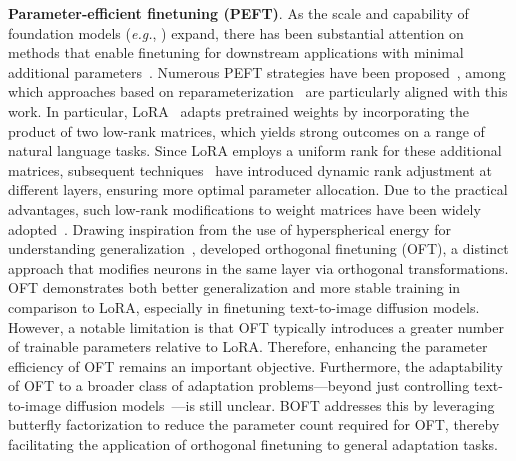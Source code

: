 \textbf{Parameter-efficient finetuning (PEFT)}. As the scale and capability of foundation models (\emph{e.g.}, \cite{brown2020language,radford2021learning,rombach2022high,kirillov2023segment}) expand, there has been substantial attention on methods that enable finetuning for downstream applications with minimal additional parameters~\cite{treviso2023efficient,ding2023parameter,lialin2023scaling}. Numerous PEFT strategies have been proposed~\cite{houlsby2019parameter,aghajanyan2020intrinsic,hulora2022,edalati2022krona,wang2022adamix,gheini2021cross,zaken2022bitfit,guo2020parameter,sung2021training,ansell2022composable,lester2021power,li2021prefix,vu2022spot,he2021towards,mao2021unipelt,karimi2021compacter,liu2022few,sung2022lst,chen2022parameter,jia2022visual,chen2022adaptformer,zhang2022neural,jie2023fact,lian2022scaling,luo2023towards}, among which approaches based on reparameterization~\cite{aghajanyan2020intrinsic,hulora2022,edalati2022krona} are particularly aligned with this work. In particular, LoRA~\cite{hulora2022} adapts pretrained weights by incorporating the product of two low-rank matrices, which yields strong outcomes on a range of natural language tasks. Since LoRA employs a uniform rank for these additional matrices, subsequent techniques~\cite{zhang2022adaptive,valipour2022dylora,zhang2023increlora} have introduced dynamic rank adjustment at different layers, ensuring more optimal parameter allocation. Due to the practical advantages, such low-rank modifications to weight matrices have been widely adopted~\cite{dettmers2023qlora,zi2023delta,chavan2023one}. Drawing inspiration from the use of hyperspherical energy for understanding generalization~\cite{liu2018learning,liu2021orthogonal}, \cite{qiu2023controlling} developed orthogonal finetuning (OFT), a distinct approach that modifies neurons in the same layer via orthogonal transformations. OFT demonstrates both better generalization and more stable training in comparison to LoRA, especially in finetuning text-to-image diffusion models. However, a notable limitation is that OFT typically introduces a greater number of trainable parameters relative to LoRA. Therefore, enhancing the parameter efficiency of OFT remains an important objective. Furthermore, the adaptability of OFT to a broader class of adaptation problems—beyond just controlling text-to-image diffusion models~\cite{qiu2023controlling}—is still unclear. BOFT addresses this by leveraging butterfly factorization to reduce the parameter count required for OFT, thereby facilitating the application of orthogonal finetuning to general adaptation tasks.


